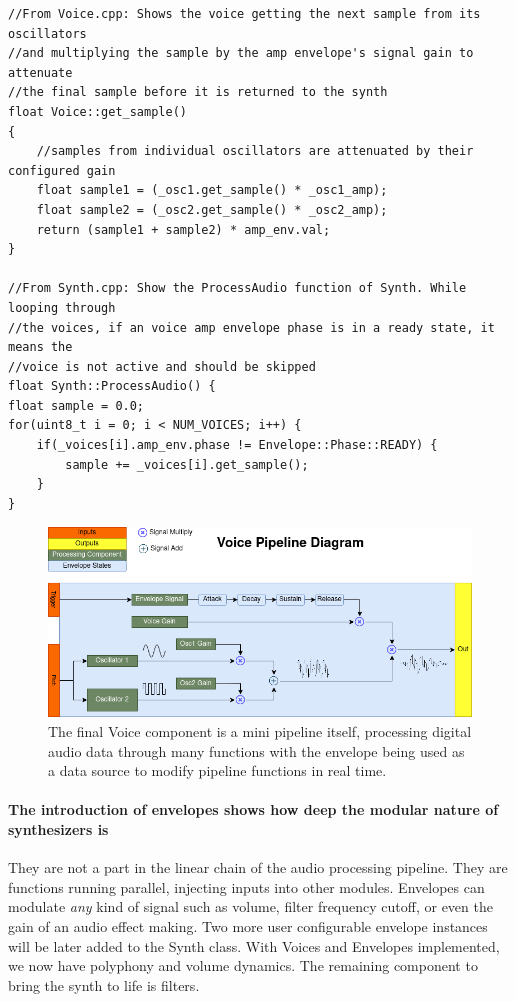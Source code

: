 \documentclass[acmlarge,screen]{acmart}
\begin{document}
	\begin{verbatim}
//From Voice.cpp: Shows the voice getting the next sample from its oscillators
//and multiplying the sample by the amp envelope's signal gain to attenuate
//the final sample before it is returned to the synth
float Voice::get_sample()
{   
	//samples from individual oscillators are attenuated by their configured gain
	float sample1 = (_osc1.get_sample() * _osc1_amp);
	float sample2 = (_osc2.get_sample() * _osc2_amp);
	return (sample1 + sample2) * amp_env.val;
}

//From Synth.cpp: Show the ProcessAudio function of Synth. While looping through
//the voices, if an voice amp envelope phase is in a ready state, it means the 
//voice is not active and should be skipped
float Synth::ProcessAudio() {
float sample = 0.0;
for(uint8_t i = 0; i < NUM_VOICES; i++) {
	if(_voices[i].amp_env.phase != Envelope::Phase::READY) {
		sample += _voices[i].get_sample();
	}
}
	\end{verbatim}

	\begin{figure}[H]
		\includegraphics[width=\linewidth]{Voice_Pipeline_Diagram}
		\caption{The final Voice component is a mini pipeline itself, processing digital audio data through many functions with the envelope being used as a data source to modify pipeline functions in real time.}
		\centering
	\end{figure}
	
	
	\paragraph{The introduction of envelopes shows how deep the modular nature of synthesizers is} They are not a part in the linear chain of the audio processing pipeline. They are functions running parallel, injecting inputs into other modules. Envelopes can modulate \textit{any} kind of signal such as volume, filter frequency cutoff, or even the gain of an audio effect making. Two more user configurable envelope instances will be later added to the Synth class. With Voices and Envelopes implemented, we now have polyphony and volume dynamics. The remaining component to bring the synth to life is filters.
\end{document}
